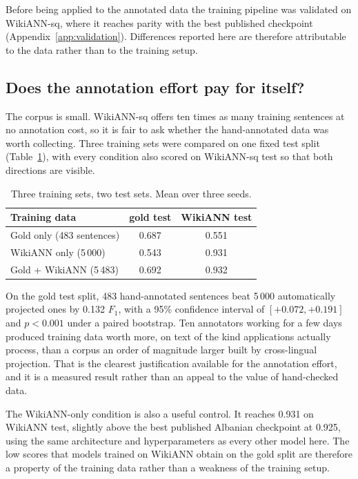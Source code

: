 Before being applied to the annotated data the training pipeline was validated on WikiANN-sq, where it reaches parity with the best published checkpoint (Appendix~\ref{app:validation}). Differences reported here are therefore attributable to the data rather than to the training setup.

\subsection{Does the annotation effort pay for itself?}
\label{sec:results:ablation}

The corpus is small. WikiANN-sq offers ten times as many training sentences at no annotation cost, so it is fair to ask whether the hand-annotated data was worth collecting. Three training sets were compared on one fixed test split (Table~\ref{tab:ablation}), with every condition also scored on WikiANN-sq test so that both directions are visible.

\begin{table}[htbp]
\centering
\caption{Three training sets, two test sets. Mean over three seeds.}
\label{tab:ablation}
\begin{tabular}{lcc}
\toprule
Training data & gold test & WikiANN test \\
\midrule
Gold only (483 sentences)      & 0.687 & 0.551 \\
WikiANN only (5\,000)          & 0.543 & 0.931 \\
Gold + WikiANN (5\,483)        & 0.692 & 0.932 \\
\bottomrule
\end{tabular}
\end{table}

On the gold test split, 483 hand-annotated sentences beat 5\,000 automatically projected ones by 0.132 $F_1$, with a 95\% confidence interval of $[+0.072, +0.191]$ and $p < 0.001$ under a paired bootstrap. Ten annotators working for a few days produced training data worth more, on text of the kind applications actually process, than a corpus an order of magnitude larger built by cross-lingual projection. That is the clearest justification available for the annotation effort, and it is a measured result rather than an appeal to the value of hand-checked data.

The WikiANN-only condition is also a useful control. It reaches 0.931 on WikiANN test, slightly above the best published Albanian checkpoint at 0.925, using the same architecture and hyperparameters as every other model here. The low scores that models trained on WikiANN obtain on the gold split are therefore a property of the training data rather than a weakness of the training setup.

